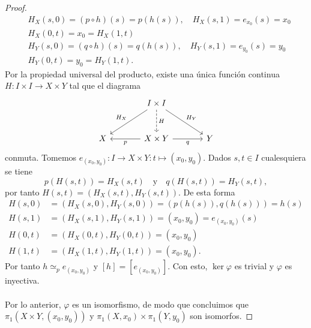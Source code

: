 \begin{proof}
\begin{align*}
&H_X(s,0)=(p\circ h)(s)=p(h(s)),\quad H_X(s,1)=e_{x_0}(s)=x_0\\
&H_X(0,t)=x_0=H_X(1,t)\\
&H_Y(s,0)=(q\circ h)(s)=q(h(s)),\quad H_Y(s,1)=e_{y_0}(s)=y_0\\
&H_Y(0,t)=y_0=H_Y(1,t).
\end{align*}
Por la propiedad universal del producto, existe una única función continua $H:I\times I\to X\times Y$ tal que el diagrama
\[
\begin{tikzcd}[column sep=large,row sep=large]
 & I\times I \arrow[dl,"H_X"'] \arrow[dr,"H_Y"] \arrow[d,dashed,"H"] & \\
X & X\times Y \arrow[l,"p"] \arrow[r,"q"'] & Y
\end{tikzcd}
\]
conmuta. Tomemos $e_{(x_0,y_0)}:I\to X\times Y:t\mapsto(x_0,y_0)$. Dados $s,t\in I$ cualesquiera se tiene
\[
p(H(s,t))=H_X(s,t)\quad\text{y}\quad q(H(s,t))=H_Y(s,t),
\]
por tanto $H(s,t)=(H_X(s,t),H_Y(s,t))$. De esta forma
\begin{align*}
H(s,0)&=(H_X(s,0),H_Y(s,0))=(p(h(s)),q(h(s)))=h(s)\\
H(s,1)&=(H_X(s,1),H_Y(s,1))=(x_0,y_0)=e_{(x_0,y_0)}(s)\\
H(0,t)&=(H_X(0,t),H_Y(0,t))=(x_0,y_0)\\
H(1,t)&=(H_X(1,t),H_Y(1,t))=(x_0,y_0).
\end{align*}
Por tanto $h\simeq_p e_{(x_0,y_0)}$ y $[h]=[e_{(x_0,y_0)}]$. Con esto, $\ker\varphi$ es trivial y $\varphi$ es inyectiva.\\\\
Por lo anterior, $\varphi$ es un isomorfismo, de modo que concluimos que $\pi_1(X\times Y,(x_0,y_0))$ y $\pi_1(X,x_0)\times\pi_1(Y,y_0)$ son isomorfos.
\end{proof}\clearpage
